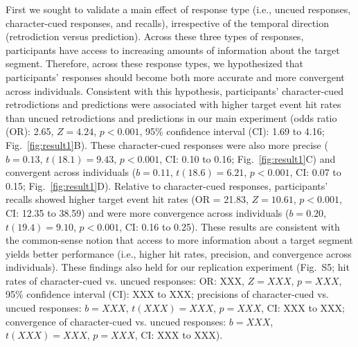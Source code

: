 \documentclass[10pt]{article}
\newcommand{\targetAsymmetries}{S5}
\begin{document}
First we sought to validate a main effect of response type (i.e., uncued responses, character-cued responses, and recalls), irrespective of the temporal direction (retrodiction versus prediction). Across these three types of responses, participants have access to increasing amounts of information about the target segment. Therefore, across these response types, we hypothesized that participants' responses should become both more accurate and more convergent across individuals. Consistent with this hypothesis, participants' character-cued retrodictions and predictions were associated with higher target event hit rates than uncued retrodictions and predictions in our main experiment (odds ratio (OR): 2.65, $Z = 4.24$, $p < 0.001$, 95\% confidence interval (CI): 1.69 to 4.16; Fig.~\ref{fig:result1}B). These character-cued responses were also more precise ($b = 0.13$, $t(18.1) = 9.43$, $p < 0.001$, CI: 0.10 to 0.16; Fig.~\ref{fig:result1}C) and convergent across individuals ($b = 0.11$, $t(18.6) = 6.21$, $p < 0.001$, CI: 0.07 to 0.15; Fig.~\ref{fig:result1}D). Relative to character-cued responses, participants' recalls showed higher target event hit rates (OR = 21.83, $Z = 10.61$, $p < 0.001$, CI: 12.35 to 38.59) and were more convergence across individuals ($b = 0.20$, $t(19.4) = 9.10$, $p < 0.001$, CI: 0.16 to 0.25). These results are consistent with the common-sense notion that access to more information about a target segment yields better performance (i.e., higher hit rates, precision, and convergence across individuals). These findings also held for our replication experiment (Fig.~\targetAsymmetries; hit rates of character-cued vs. uncued responses: OR: XXX, $Z = XXX$, $p = XXX$, 95\% confidence interval (CI): XXX to XXX; precisions of character-cued vs. uncued responses: $b = XXX$, $t(XXX) = XXX$, $p = XXX$, CI: XXX to XXX; convergence of character-cued vs. uncued responses: $b = XXX$, $t(XXX) = XXX$, $p = XXX$, CI: XXX to XXX).
\end{document}

